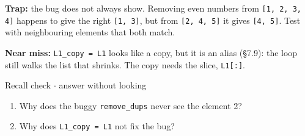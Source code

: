 \documentclass[11pt]{article}
\begin{document}
\begin{keepsection}
\begin{notebox}\textbf{Trap:} the bug does not always show. Removing even numbers from \texttt{[1, 2, 3, 4]} happens to give the right \texttt{[1, 3]}, but from \texttt{[2, 4, 5]} it gives \texttt{[4, 5]}. Test with neighbouring elements that both match.\end{notebox}

\begin{notebox}\textbf{Near miss:} \texttt{L1\_copy = L1} looks like a copy, but it is an alias (§7.9): the loop still walks the list that shrinks. The copy needs the slice, \texttt{L1[:]}.\end{notebox}

\begin{recallbox}{Recall check \ensuremath{\cdot} answer without looking}
\begin{enumerate}
\item Why does the buggy \texttt{remove\_dups} never see the element 2?
\item Why does \texttt{L1\_copy = L1} not fix the bug?
\end{enumerate}

\end{recallbox}
\end{keepsection}
\end{document}
